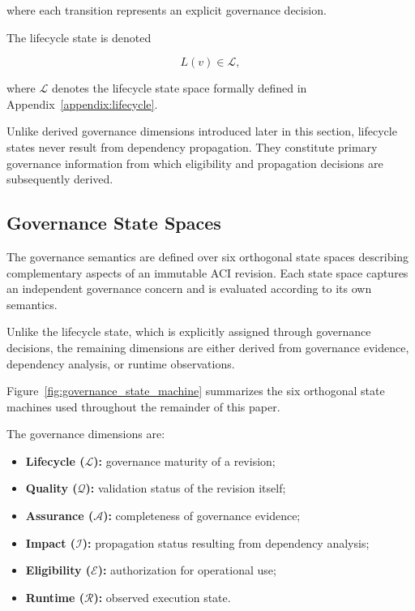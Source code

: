 \documentclass[10pt]{article}
\begin{document}
where each transition represents an explicit governance decision.

The lifecycle state is denoted

\begin{equation}
	L(v)\in\mathcal{L},
	\label{eq:lifecycle_state}
\end{equation}

where $\mathcal{L}$ denotes the lifecycle state space formally defined in Appendix~\ref{appendix:lifecycle}.

Unlike derived governance dimensions introduced later in this section, lifecycle states never result from dependency propagation. They constitute primary governance information from which eligibility and propagation decisions are subsequently derived.

\subsection{Governance State Spaces}
\label{sec:governance_state_spaces}

The governance semantics are defined over six orthogonal state spaces describing complementary aspects of an immutable ACI revision. Each state space captures an independent governance concern and is evaluated according to its own semantics.

Unlike the lifecycle state, which is explicitly assigned through governance decisions, the remaining dimensions are either derived from governance evidence, dependency analysis, or runtime observations.

Figure~\ref{fig:governance_state_machine} summarizes the six orthogonal state machines used throughout the remainder of this paper.

The governance dimensions are:

\begin{itemize}
	\item \textbf{Lifecycle ($\mathcal{L}$):} governance maturity of a revision;
	\item \textbf{Quality ($\mathcal{Q}$):} validation status of the revision itself;
	\item \textbf{Assurance ($\mathcal{A}$):} completeness of governance evidence;
	\item \textbf{Impact ($\mathcal{I}$):} propagation status resulting from dependency analysis;
	\item \textbf{Eligibility ($\mathcal{E}$):} authorization for operational use;
	\item \textbf{Runtime ($\mathcal{R}$):} observed execution state.
\end{itemize}
\end{document}
